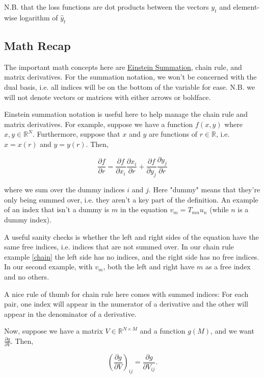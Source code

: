 \documentclass[11pt,twoside]{article}
\begin{document}
\noindent N.B. that the loss functions are dot products between the vectors $y_t$ and element-wise logarithm of $\hat{y}_t$


\subsection{Math Recap}
The important math concepts here are \href{http://planetmath.org/einsteinsummationconvention}{Einstein Summation}, chain rule, and matrix derivatives. For the summation notation, we won't be concerned with the dual basis, i.e. all indices will be on the bottom of the variable for ease. N.B. we will not denote vectors or matrices with either arrows or boldface.

Einstein summation notation is useful here to help manage the chain rule and matrix derivatives. For example, suppose we have a function $f(x,y)$ where $x,y\in \mathbb{R}^N$. Furthermore, suppose that $x$ and $y$ are functions of $r\in\mathbb{R}$, i.e. $x=x(r)$ and $y=y(r)$. Then,

\begin{equation}
\label{chain}
\frac{\partial f}{\partial r}=\frac{\partial f}{\partial x_i}\frac{\partial x_i}{\partial r}+\frac{\partial f}{\partial y_j}\frac{\partial y_j}{\partial r}
\end{equation}

\noindent where we sum over the dummy indices $i$ and $j$. Here "dummy" means that they're only being summed over, i.e. they aren't a key part of the definition. An example of an index that isn't a dummy is $m$ in the equation $v_m=T_{m n} u_n$ (while $n$ is a dummy index).

A useful sanity checks is whether the left and right sides of the equation have the same free indices, i.e. indices that are not summed over. In our chain rule example \eqref{chain} the left side has no indices, and the right side has no free indices. In our second example, with $v_m$, both the left and right have $m$ as a free index and no others.

A nice rule of thumb for chain rule here comes with summed indices: For each pair, one index will appear in the numerator of a derivative and the other will appear in the denominator of a derivative.

Now, suppose we have a matrix $V\in\mathbb{R}^{N\times M}$ and a function $g(M)$, and we want $\frac{\partial g}{\partial V}$. Then,

\begin{equation}
\label{matcalc}
\left( \frac{\partial g}{\partial V}\right)_{i j}=\frac{\partial g}{\partial V_{i j}}.
\end{equation}
\end{document}
